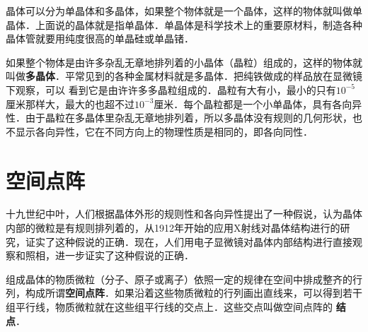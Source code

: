 晶体可以分为单晶体和多晶体，如果整个物体就是一个晶体，这样的物体就叫做单晶体．上面说的晶体就是指单晶体．单晶体是科学技术上的重要原材料，制造各种晶体管就要用纯度很高的单晶硅或单晶锗．

如果整个物体是由许多杂乱无章地排列着的小晶体（晶粒）组成的，这样的物体就叫做\textbf{多晶体}．平常见到的各种金属材料就是多晶体．把纯铁做成的样品放在显微镜下观察，可以
看到它是由许许多多晶粒组成的．晶粒有大有小，最小的只有$10^{-5}$厘米那样大，最大的也超不过$10^{-3}$厘米．每个晶粒都是一个小单晶体，具有各向异性．由于晶粒在多晶体里杂乱无章地排列着，所以多晶体没有规则的几何形状，也不显示各向异性，它在不同方向上的物理性质是相同的，即各向同性．

\section{空间点阵}
十九世纪中叶，人们根据晶体外形的规则性和各向异性提出了一种假说，认为晶体内部的微粒是有规则排列着的，从1912年开始的应用X射线对晶体结构进行的研究，证实了这种假说的正确．现在，人们用电子显微镜对晶体内部结构进行直接观察和照相，进一步证实了这种假说的正确．

组成晶体的物质微粒（分子、原子或离子）依照一定的规律在空间中排成整齐的行列，构成所谓\textbf{空间点阵}．如果沿着这些物质微粒的行列画出直线来，可以得到若干组平行线，物质微粒就在这些组平行线的交点上．这些交点叫做空间点阵的
\textbf{结点}．

